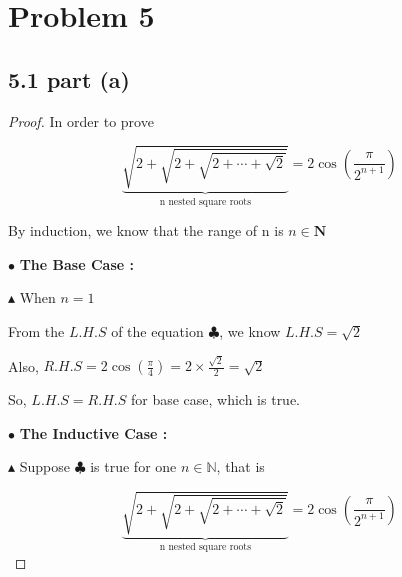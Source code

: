 \documentclass[12pt]{article}
\begin{document}
\newpage
\section*{Problem 5}

\subsection*{5.1 part (a)}

\begin{proof}
    In order to prove 
    
    \[ \underbrace{\sqrt{2+\sqrt{2+\sqrt{2+\cdots + \sqrt{2}}}} }
    _\text{n nested square roots} = 2\cos
    \left(  \frac{\pi}{2^{n+1}}  \right) \]
    
    \vspace*{0.3cm}
    \hspace*{1.2cm}
    By induction, we know that the range of n is $ n \in \mathbf{N}$

    \vspace*{0.3cm}
    
    $\bullet$ \textbf{The Base Case :}

    \vspace*{0.3cm}
    \hspace*{1.2cm}
    $\blacktriangle$  When $n=1$ 
    
    \vspace*{0.3cm}
    \hspace*{1.2cm}
    From the $L.H.S$ of the equation $\clubsuit$, we know $L.H.S = \sqrt 2$

    \vspace*{0.3cm}
    \hspace*{1.2cm}
    Also, $R.H.S = 2\cos \left( \frac{\pi}{4} \right) = 2\times \frac{\sqrt 2}{2} = \sqrt 2 $

    \vspace*{0.3cm}
    \hspace*{1.2cm}
    So, $L.H.S = R.H.S$ for base case, which is true.

    \vspace*{0.3cm}
    
    $\bullet$ \textbf{The Inductive Case :}

    \vspace*{0.3cm}
    \hspace*{1.2cm}
    $\blacktriangle$ Suppose $\clubsuit$ is true for one $n \in \mathbb{N}$, that is

    \[ \underbrace{\sqrt{2+\sqrt{2+\sqrt{2+\cdots + \sqrt{2}}}} }
    _\text{n nested square roots} = 2\cos
    \left(  \frac{\pi}{2^{n+1}}  \right) \]


\end{proof}
\end{document}
